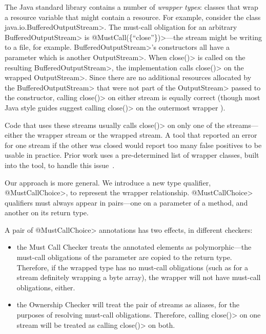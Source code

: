 The Java standard library contains a number of \emph{wrapper types}:
classes that wrap a resource variable that might contain a resource.
For example, consider the class \<java.io.BufferedOutputStream>.  The
must-call obligation for an arbitrary \<BufferedOutputStream> is
\<@MustCall(\{``close''\})>---the stream might be writing to a file,
for example.  \<BufferedOutputStream>'s constructors all have a
parameter which is another \<OutputStream>. When \<close()> is called
on the resulting \<BufferedOutputStream>, the implementation calls
\<close()> on the wrapped \<OutputStream>. Since there are no
additional resources allocated by the \<BufferedOutputStream> that
were not part of the \<OutputStream> passed to the constructor,
calling \<close()> on either stream is equally correct (though most
Java style guides suggest calling \<close()> on the outermost
wrapper ).

Code that uses these streams usually calls \<close()> on only one
of the streams---either the wrapper stream or the wrapped stream.
A tool that reported an error for one stream if the other was closed
would report too many false positives to be usable in practice.
Prior work uses a pre-determined list of wrapper classes, built into
the tool, to handle this issue~\cite{TorlakC10}. 

Our approach is more general. We introduce a new type qualifier,
\<@MustCallChoice>, to represent the wrapper relationship. \<@MustCallChoice>
qualifiers must always appear in pairs---one on a parameter of a method,
and another on its return type.

A pair of \<@MustCallChoice> annotations has two effects, in different
checkers:
\begin{itemize}
\item the Must Call Checker treats the annotated elements as polymorphic---the
  must-call obligations of the parameter are copied to the return type.
  Therefore, if the wrapped type has no must-call obligations (such as
  for a stream definitely wrapping a byte array), the wrapper will not
  have must-call obligations, either.
\item the Ownership Checker will treat the pair of streams as aliases,
  for the purposes of resolving must-call obligations. Therefore, calling
  \<close()> on one stream will be treated as calling \<close()> on both.
\end{itemize}

